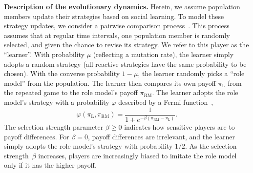 \documentclass[11pt]{article}
\def\rolemodel{\text{RM}}
\def\learner{\text{L}}
\theoremstyle{plainCl1}
\theoremstyle{plainCl2}
\begin{document}
\noindent
{\bf Description of the evolutionary dynamics.}
Herein, we assume population members update their strategies based on social learning. 
To model these strategy updates, we consider a pairwise comparison process~\citep{traulsen2007pairwise}. 
This process assumes that at regular time intervals, one population member is randomly selected, and given the chance to revise its strategy.
We refer to this player as the ``learner''.
With probability $\mu$ (reflecting a mutation rate), the learner simply adopts a random strategy (all reactive strategies have the same probability to be chosen). 
With the converse probability $1\!-\!\mu$, the learner randomly picks a ``role model'' from the population. 
The learner then compares its own payoff $\pi_\learner$ from the repeated game to the role model's payoff $\pi_\rolemodel$. 
The learner adopts the role model's strategy with a probability \(\varphi\) described by a Fermi function~\citep{blume:GEB:1995,szabo:PRE:1998}, 
\begin{equation} \label{Eq:rho}
    \varphi\left(\pi_\learner, \pi_\rolemodel\right) = \frac{1}{1\!+\! e^{- \!\beta\left(\pi_\rolemodel- \pi_\learner\right)}}.
\end{equation}
The selection strength parameter $\beta\!\ge\!0$ indicates how sensitive players are to payoff differences. 
For $\beta\!=\!0$, payoff differences are irrelevant, and the learner simply adopts the role model's strategy with probability $1/2$. As the selection strength~$\beta$ increases, players are increasingly biased to imitate the role model only if it has the higher payoff. 

\end{document}
